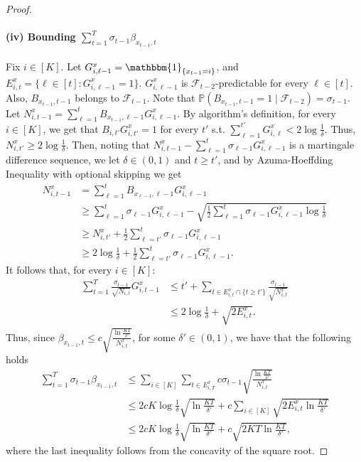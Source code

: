 \begin{proof}
    \paragraph{(iv) Bounding $\sum_{t=1}^T \sigma_{t-1}\beta_{x_{t-1},t}$}
    Fix $i\in [K]$. Let $G_{i,\ell-1}^x = \mathbbm{1}_{\{x_{l-1} = i\}}$, and $E_{i,t}^x = \{ \ell \in [t] :  G_{i,\ell-1}^x=1\}$. $G_{i,{\ell-1}}^x$ is $\mathcal{F}_{t-2}$-predictable for every $\ell \in [t]$. Also, $B_{x_{t-1}, t-1}$ belongs to $\mathcal{F}_{t-1}$. Note that $\mathbb{P}(B_{x_{t-1}, t-1}=1 \mid \mathcal{F}_{t-2}) = \sigma_{t-1}$. Let $N_{i,t-1}^x = \sum_{\ell=1}^{t} B_{x_{t-1}, \ell-1} G_{i,\ell-1}^x$. By algorithm's definition, for every $i \in [K]$, we get that $B_{i,t'}G_{i,t'}^x = 1$ for every $t'$ s.t. $\sum_{\ell=1}^{t'} G_{i,\ell}^x < 2\log \frac{1}{\delta}$. Thus, $N_{i,t'}^x \ge 2\log \frac{1}{\delta}$. Then, noting that $N_{i,t-1}^x-\sum_{\ell = 1}^{t} \sigma_{\ell-1} G_{i,\ell-1}^x$ is a martingale difference sequence, we let $\delta \in (0,1)$ and $t\ge t'$, and by Azuma-Hoeffding Inequality with optional skipping we get
    \begin{align*}
        N_{i,t-1}^x &= \sum_{\ell = 1}^{t} B_{x_{\ell-1}, \ell-1} G_{i,\ell-1}^x\\
        &\ge  \sum_{\ell = 1}^{t} \sigma_{\ell-1} G_{i,\ell-1}^x - \sqrt{\frac{1}{2}\sum_{\ell = 1}^{t} \sigma_{\ell-1} G_{i,\ell-1}^x \log \frac{1}{\delta}} \\
        &\ge N_{i,t'}^x+\frac{1}{2}\sum_{\ell = t'}^{t} \sigma_{\ell-1} G_{i,\ell-1}^x \\
        &\ge 2\log\frac{1}{\delta}+\frac{1}{2}\sum_{\ell = t'}^{t} \sigma_{\ell-1} G_{i,\ell-1}^x.
    \end{align*}
    It follows that, for every $i \in [K]$:
    \begin{align*}
        \sum_{t =1}^T\frac{\sigma_{t-1}}{\sqrt{N_{i,t}}}G_{i,t-1}^x &\le t' + \sum_{t \in E_{i,t}^x \cap \{t\ge t'\}}\frac{\sigma_{t-1}}{\sqrt{N_{i,t}^x}} \\
        &\le 2\log \frac{1}{\delta} + \sqrt{2 E_{i,t}^x}.
    \end{align*}
    Thus, since $\beta_{x_{t-1},t} \le c\sqrt{\frac{\ln \frac{KT}{\delta'}}{N_{i,t}^x}}$, for some $\delta' \in (0,1)$, we have that the following holds
    \begin{align*}
        \sum_{t=1}^T \sigma_{t-1}\beta_{x_{t-1},t} &\le \sum_{i \in [K]} \sum_{t \in E_{i,T}^x} c\sigma_{t-1}\sqrt{\frac{\ln \frac{KT}{\delta'}}{N_{i,t}^x}}  \\
        &\le 2cK\log \frac{1}{\delta} \sqrt{ \ln \frac{KT}{\delta'}} + c\sum_{i \in [K]}\sqrt{2 E_{i,t}^x \ln \frac{KT}{\delta'}} \\
        &\le 2cK\log \frac{1}{\delta} \sqrt{\ln \frac{KT}{\delta'}} + c\sqrt{2 KT \ln \frac{KT}{\delta'}},
    \end{align*}
    where the last inequality follows from the concavity of the square root.


\end{proof}
